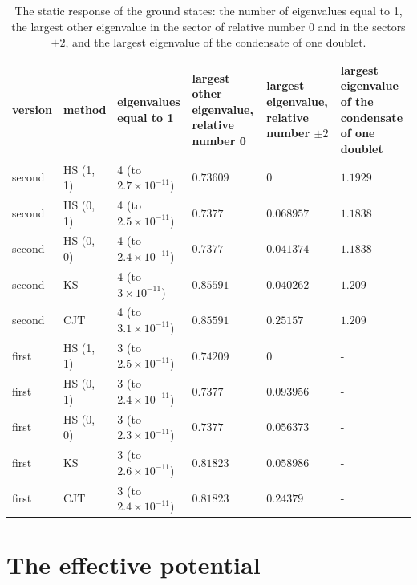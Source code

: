 \documentclass[aps,prd,onecolumn,superscriptaddress,nofootinbib,floatfix,longbibliography]{revtex4-2}
\begin{document}
\begin{table}[!htbp]
\caption{\label{tab:response}The static response of the ground states: the number of eigenvalues equal to 1, the largest other eigenvalue in the sector of relative number 0 and in the sectors $\pm2$, and the largest eigenvalue of the condensate of one doublet.}
\begingroup\centering\footnotesize\setlength{\tabcolsep}{4pt}
\begin{tabular}{llp{}p{}p{}p{}}
\hline\hline
version & method & eigenvalues equal to 1 & largest other eigenvalue, relative number 0 & largest eigenvalue, relative number $\pm2$ & largest eigenvalue of the condensate of one doublet \\ \hline
second & HS (1, 1) & 4 (to $2.7\times10^{-11}$) & $0.73609$ & $0$ & $1.1929$ \\
second & HS (0, 1) & 4 (to $2.5\times10^{-11}$) & $0.7377$ & $0.068957$ & $1.1838$ \\
second & HS (0, 0) & 4 (to $2.4\times10^{-11}$) & $0.7377$ & $0.041374$ & $1.1838$ \\
second & KS & 4 (to $3\times10^{-11}$) & $0.85591$ & $0.040262$ & $1.209$ \\
second & CJT & 4 (to $3.1\times10^{-11}$) & $0.85591$ & $0.25157$ & $1.209$ \\
first & HS (1, 1) & 3 (to $2.5\times10^{-11}$) & $0.74209$ & $0$ & - \\
first & HS (0, 1) & 3 (to $2.4\times10^{-11}$) & $0.7377$ & $0.093956$ & - \\
first & HS (0, 0) & 3 (to $2.3\times10^{-11}$) & $0.7377$ & $0.056373$ & - \\
first & KS & 3 (to $2.6\times10^{-11}$) & $0.81823$ & $0.058986$ & - \\
first & CJT & 3 (to $2.4\times10^{-11}$) & $0.81823$ & $0.24379$ & - \\
\hline\hline
\end{tabular}\par
\endgroup
\end{table}

\section{The effective potential}
\label{sec:potential}
\end{document}
